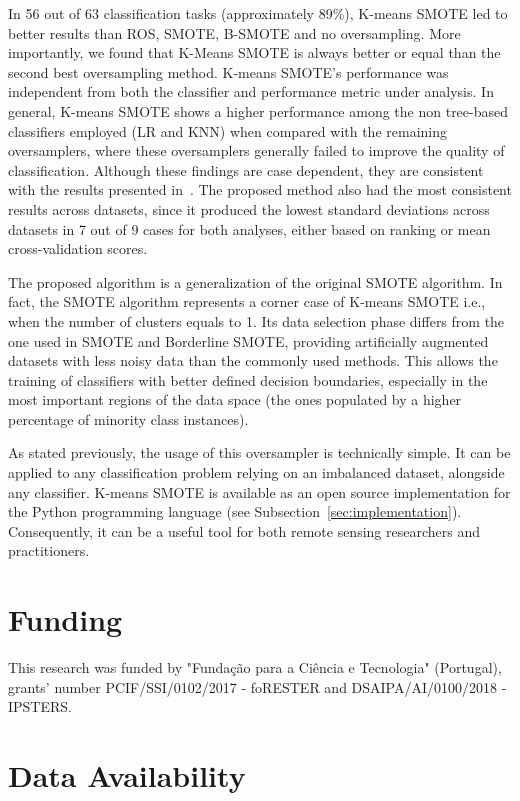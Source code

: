 \documentclass[preprint,12pt]{elsarticle}
\begin{document}
In 56 out of 63 classification tasks (approximately 89\%), K-means SMOTE led
to better results than ROS, SMOTE, B-SMOTE and no oversampling. More
importantly, we found that K-Means SMOTE is always better or equal than the
second best oversampling method.  K-means SMOTE's performance was independent
from both the classifier and performance metric under analysis. In general,
K-means SMOTE shows a higher performance among the non tree-based classifiers
employed (LR and KNN) when compared with the remaining oversamplers, where
these oversamplers generally failed to improve the quality of classification.
Although these findings are case dependent, they are consistent with the
results presented in~\cite{Douzas2018}. The proposed method also had the most
consistent results across datasets, since it produced the lowest standard
deviations across datasets in 7 out of 9 cases for both analyses, either based
on ranking or mean cross-validation scores.

The proposed algorithm is a generalization of the original SMOTE algorithm. In
fact, the SMOTE algorithm represents a corner case of K-means SMOTE i.e., when
the number of clusters equals to 1. Its data selection phase differs from the
one used in SMOTE and Borderline SMOTE, providing artificially augmented
datasets with less noisy data than the commonly used methods. This allows the
training of classifiers with better defined decision boundaries, especially in
the most important regions of the data space (the ones populated by a higher
percentage of minority class instances).

As stated previously, the usage of this oversampler is technically simple. It
can be applied to any classification problem relying on an imbalanced dataset,
alongside any classifier. K-means SMOTE is available as an open source
implementation for the Python programming language (see
Subsection~\ref{sec:implementation}).  Consequently, it can be a useful tool
for both remote sensing researchers and practitioners.

\section{Funding}

This research was funded by "Fundação para a Ciência e Tecnologia" (Portugal),
grants' number PCIF/SSI/0102/2017 - foRESTER and DSAIPA/AI/0100/2018 -
IPSTERS.

\section{Data Availability}
\end{document}
